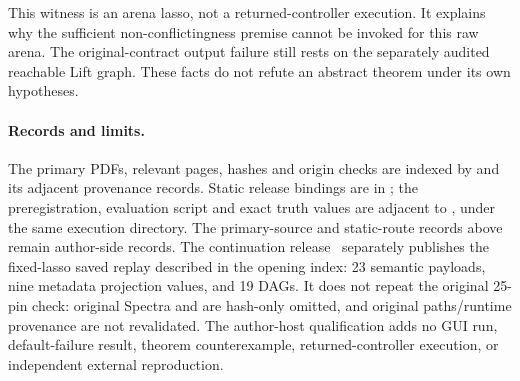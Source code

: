 This witness is an arena lasso, not a returned-controller execution.
It explains why the sufficient non-conflictingness premise cannot be
invoked for this raw arena. The original-contract output failure still
rests on the separately audited reachable Lift graph. These facts do
not refute an abstract theorem under its own hypotheses.

\paragraph{Records and limits.}
The primary PDFs, relevant pages, hashes and origin checks are indexed by
and its adjacent provenance records. Static release bindings are in
; the preregistration, evaluation
script and exact truth values are adjacent to
, under the same execution directory.
The primary-source and static-route records above remain author-side
records. The continuation release~\cite{continuationartifact} separately
publishes the fixed-lasso saved replay described in the opening index:
23 semantic payloads, nine metadata projection values, and 19 DAGs.
It does not repeat the original 25-pin check: original Spectra and
 are hash-only omitted, and original paths/runtime
provenance are not revalidated. The author-host qualification adds no GUI
run, default-failure result, theorem counterexample, returned-controller
execution, or independent external reproduction.
